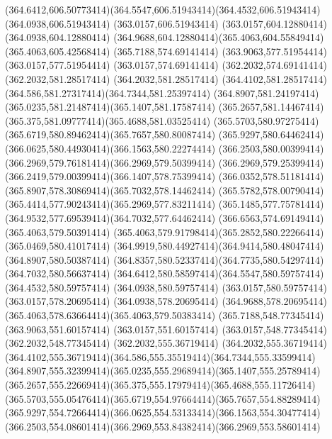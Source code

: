 {{	\curveto(364.6412,606.50773414)(364.5547,606.51943414)(364.4532,606.51943414)
	\lineto(364.0938,606.51943414)
	\lineto(363.0157,606.51943414)
	\lineto(363.0157,604.12880414)
	\lineto(364.0938,604.12880414)
	\curveto(364.9688,604.12880414)(365.4063,604.55849414)(365.4063,605.42568414)
	\closepath
	\moveto(365.7188,574.69141414)
	\lineto(363.9063,577.51954414)
	\lineto(363.0157,577.51954414)
	\lineto(363.0157,574.69141414)
	\lineto(362.2032,574.69141414)
	\lineto(362.2032,581.28517414)
	\lineto(364.2032,581.28517414)
	\curveto(364.4102,581.28517414)(364.586,581.27317414)(364.7344,581.25397414)
	\curveto(364.8907,581.24197414)(365.0235,581.21487414)(365.1407,581.17587414)
	\curveto(365.2657,581.14467414)(365.375,581.09777414)(365.4688,581.03525414)
	\curveto(365.5703,580.97275414)(365.6719,580.89462414)(365.7657,580.80087414)
	\curveto(365.9297,580.64462414)(366.0625,580.44930414)(366.1563,580.22274414)
	\curveto(366.2503,580.00399414)(366.2969,579.76181414)(366.2969,579.50399414)
	\curveto(366.2969,579.25399414)(366.2419,579.00399414)(366.1407,578.75399414)
	\curveto(366.0352,578.51181414)(365.8907,578.30869414)(365.7032,578.14462414)
	\curveto(365.5782,578.00790414)(365.4414,577.90243414)(365.2969,577.83211414)
	\curveto(365.1485,577.75781414)(364.9532,577.69539414)(364.7032,577.64462414)
	\lineto(366.6563,574.69149414)
	\closepath
	\moveto(365.4063,579.50391414)
	\curveto(365.4063,579.91798414)(365.2852,580.22266414)(365.0469,580.41017414)
	\curveto(364.9919,580.44927414)(364.9414,580.48047414)(364.8907,580.50387414)
	\curveto(364.8357,580.52337414)(364.7735,580.54297414)(364.7032,580.56637414)
	\curveto(364.6412,580.58597414)(364.5547,580.59757414)(364.4532,580.59757414)
	\lineto(364.0938,580.59757414)
	\lineto(363.0157,580.59757414)
	\lineto(363.0157,578.20695414)
	\lineto(364.0938,578.20695414)
	\curveto(364.9688,578.20695414)(365.4063,578.63664414)(365.4063,579.50383414)
	\closepath
	\moveto(365.7188,548.77345414)
	\lineto(363.9063,551.60157414)
	\lineto(363.0157,551.60157414)
	\lineto(363.0157,548.77345414)
	\lineto(362.2032,548.77345414)
	\lineto(362.2032,555.36719414)
	\lineto(364.2032,555.36719414)
	\curveto(364.4102,555.36719414)(364.586,555.35519414)(364.7344,555.33599414)
	\curveto(364.8907,555.32399414)(365.0235,555.29689414)(365.1407,555.25789414)
	\curveto(365.2657,555.22669414)(365.375,555.17979414)(365.4688,555.11726414)
	\curveto(365.5703,555.05476414)(365.6719,554.97664414)(365.7657,554.88289414)
	\curveto(365.9297,554.72664414)(366.0625,554.53133414)(366.1563,554.30477414)
	\curveto(366.2503,554.08601414)(366.2969,553.84382414)(366.2969,553.58601414)
}}
